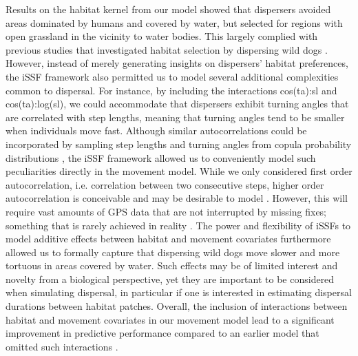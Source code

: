 \documentclass[../FinalThesis.tex]{subfiles}
\begin{document}
Results on the habitat kernel from our model showed that dispersers avoided
areas dominated by humans and covered by water, but selected for regions with
open grassland in the vicinity to water bodies. This largely complied with
previous studies that investigated habitat selection by dispersing wild dogs
\citep{Davies-Mostert.2012, Masenga.2016, Woodroffe.2020, ONeill.2020,
Hofmann.2021}. However, instead of merely generating insights on dispersers'
habitat preferences, the iSSF framework also permitted us to model several
additional complexities common to dispersal. For instance, by including the
interactions \textsf{cos(ta):sl} and \textsf{cos(ta):log(sl)}, we could
accommodate that dispersers exhibit turning angles that are correlated with step
lengths, meaning that turning angles tend to be smaller when individuals move
fast. Although similar autocorrelations could be incorporated by sampling step
lengths and turning angles from copula probability distributions
\citep{Hodel.2022}, the iSSF framework allowed us to conveniently model such
peculiarities directly in the movement model. While we only considered first
order autocorrelation, i.e. correlation between two consecutive steps, higher
order autocorrelation is conceivable and may be desirable to model
\citep{Dray.2010, McClintock.2012}. However, this will require vast amounts of
GPS data that are not interrupted by missing fixes; something that is rarely
achieved in reality \citep{Graves.2006}. The power and flexibility of iSSFs to
model additive effects between habitat and movement covariates
\citep{Avgar.2016, Signer.2017} furthermore allowed us to formally capture that
dispersing wild dogs move slower and more tortuous in areas covered by water.
Such effects may be of limited interest and novelty from a biological
perspective, yet they are important to be considered when simulating dispersal,
in particular if one is interested in estimating dispersal durations between
habitat patches. Overall, the inclusion of interactions between habitat and
movement covariates in our movement model lead to a significant improvement in
predictive performance compared to an earlier model that omitted such
interactions \citep{Hofmann.2021}.

\end{document}
